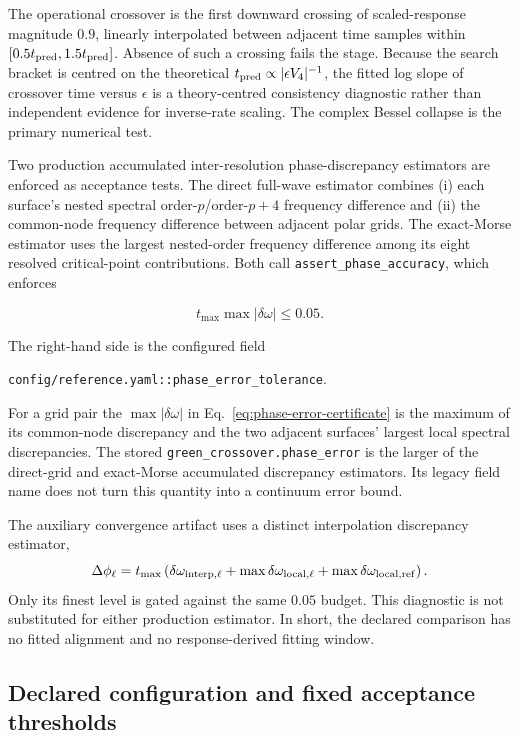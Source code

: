 The operational crossover is the first downward crossing of scaled-response
magnitude \(0.9\), linearly interpolated between adjacent time samples within
\([0.5t_{\rm pred},1.5t_{\rm pred}]\).  Absence of such a crossing fails the
stage.  Because the search bracket is centred on the theoretical
\(t_{\rm pred}\propto|\epsilon V_4|^{-1}\), the fitted log slope of crossover
time versus \(\epsilon\) is a theory-centred consistency diagnostic rather
than independent evidence for inverse-rate scaling.  The complex Bessel
collapse is the primary numerical test.

Two production accumulated inter-resolution phase-discrepancy estimators are
enforced as acceptance tests.  The direct full-wave estimator combines (i)
each surface's nested spectral order-\(p\)/order-\(p+4\) frequency difference
and (ii) the common-node frequency difference between adjacent polar grids.
The exact-Morse estimator uses the largest nested-order frequency difference
among its eight resolved critical-point contributions.  Both call
\texttt{assert\_phase\_accuracy}, which enforces

\begin{equation}
 t_{\max}\max|\delta\omega|\le0.05 .
 \label{eq:phase-error-certificate}
\end{equation}

The right-hand side is the configured field
\begin{center}
\texttt{config/reference.yaml::phase\_error\_tolerance}.
\end{center}
For a grid pair the
\(\max|\delta\omega|\) in Eq.~\eqref{eq:phase-error-certificate} is the
maximum of its common-node discrepancy and the two adjacent surfaces' largest
local spectral discrepancies.  The stored
\texttt{green\_crossover.phase\_error} is the larger of the direct-grid and
exact-Morse accumulated discrepancy estimators.  Its legacy field name does
not turn this quantity into a continuum error bound.

The auxiliary convergence artifact uses a distinct interpolation discrepancy
estimator,
\[
 \Delta\phi_\ell=t_{\max}
 \left(\delta\omega_{{\rm interp},\ell}
 +\max\delta\omega_{{\rm local},\ell}
 +\max\delta\omega_{{\rm local},{\rm ref}}\right).
\]
Only its finest level is gated against the same \(0.05\) budget.  This
diagnostic is not substituted for either production estimator.
In short, the declared comparison has no fitted alignment and no
response-derived fitting window.

\subsection{Declared configuration and fixed acceptance thresholds}

